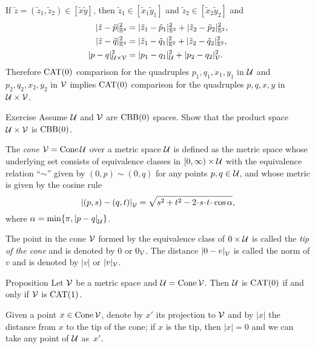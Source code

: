 If $\tilde z=(\tilde z_1,\tilde z_2)\in [\tilde x\tilde y]$, then $\tilde z_1\in [\tilde x_1\tilde y_1]$ and $\tilde z_2\in [\tilde x_2\tilde y_2]$ and
\begin{align*}
\dist[2]{\tilde z}{\tilde p}{\EE^4}&=\dist[2]{\tilde z_1}{\tilde p_1}{\EE^2}+\dist[2]{\tilde z_2}{\tilde p_2}{\EE^2},
\\
\dist[2]{\tilde z}{\tilde q}{\EE^4}&=\dist[2]{\tilde z_1}{\tilde q_1}{\EE^2}+\dist[2]{\tilde z_2}{\tilde q_2}{\EE^2},
\\
\dist[2]{p}{q}{\spc{U}\times\spc{V}}&=\dist[2]{p_1}{q_1}{\spc{U}}+\dist[2]{p_2}{q_2}{\spc{V}}.
\end{align*}
Therefore $\mathrm{CAT}(0)$ comparison for the quadruples $p_1,q_1,x_1,y_1$ in $\mathcal{U}$
and 
$p_2,q_2,x_2,y_2$ in $\mathcal{V}$ implies 
$\mathrm{CAT}(0)$ comparison for the quadruples $p,q,x,y$ in $\mathcal{U}\times \mathcal{V}$.
\qeds

\begin{thm}{Exercise}\label{ex:product-CBB}
Assume $\mathcal{U}$ and $\mathcal{V}$ are $\mathrm{CBB}(0)$ spaces.
Show that the product space $\mathcal{U}\times\mathcal{V}$ is $\mathrm{CBB}(0)$.
\end{thm}

The \emph{cone} $\mathcal{V}=\mathop{\rm Cone}\nolimits\mathcal{U}$ over a metric space $\mathcal{U}$
is defined as the metric space whose underlying set consists of
equivalence classes in
$[0,\infty)\times \mathcal{U}$ with the equivalence relation ``$\sim$'' given by $(0,p)\sim (0,q)$ for any points $p,q\in\mathcal{U}$,
and whose metric is given by the cosine rule
\[
\dist{(p,s)}{(q,t)}{\spc{V}} 
=
\sqrt{s^2+t^2-2\cdot s\cdot t\cdot \cos\alpha},
\]
where $\alpha= \min\{\pi, \dist{p}{q}{\spc{U}}\}$.

The point in the cone $\mathcal{V}$ formed by the equivalence class of $0\times\mathcal{U}$ is called the \emph{tip of the cone} and is denoted by $0$ or $0_{\mathcal{V}}$.
The distance $\dist{0}{v}{\spc{V}}$ is called the norm of $v$ and is denoted by $|v|$ or $|v|_{\mathcal{V}}$.


\begin{thm}{Proposition}\label{ex:cone+susp}
Let $\mathcal{V}$ be a metric space and $\mathcal{U}=\mathop{\rm Cone}\nolimits\mathcal{V}$.
Then $\mathcal{U}$ is  $\mathrm{CAT}(0)$ if and only if $\mathcal{V}$ is $\mathrm{CAT}(1)$.
\end{thm}

Given a point $x\in \mathop{\rm Cone}\nolimits\mathcal{V}$, denote by $x'$ its projection to $\mathcal{V}$
and by $|x|$ the distance from $x$ to the tip of the cone;
if $x$ is the tip, then $|x|=0$ and we can take any point of $\mathcal{U}$ as~$x'$.

